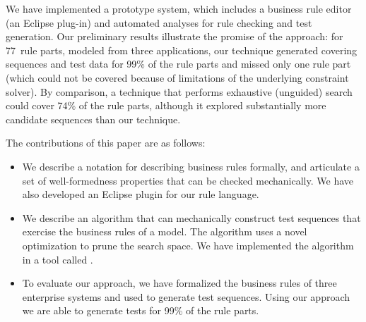 We have implemented a prototype system, which includes a business rule editor
(an Eclipse plug-in) and automated analyses for rule checking and test
generation. Our preliminary results illustrate the promise of the approach: for
77~rule parts, modeled from three applications, our technique generated covering
sequences and test data for 99\% of the rule parts and missed only one rule part
(which could not be covered because of limitations of the underlying constraint
solver). By comparison, a technique that performs exhaustive (unguided) search
could cover 74\% of the rule parts, although it explored substantially more
candidate sequences than our technique.

The contributions of this paper are as follows:
\begin{itemize}[noitemsep]
\item We describe a notation for describing business rules formally, and articulate
  a set of well-formedness properties that can be checked mechanically. We have 
  also developed an Eclipse plugin for our rule language.
\item We describe an algorithm that can mechanically construct test sequences
  that exercise the business rules of a model. The algorithm uses a
  novel optimization to prune the search space. We have implemented
  the algorithm in a tool called \tool{}.
\item To evaluate our approach, we have formalized the business rules
  of three enterprise systems and used \tool{} to generate test
  sequences. Using our approach we are able to generate tests for 99\%
  of the rule parts.
\end{itemize}


